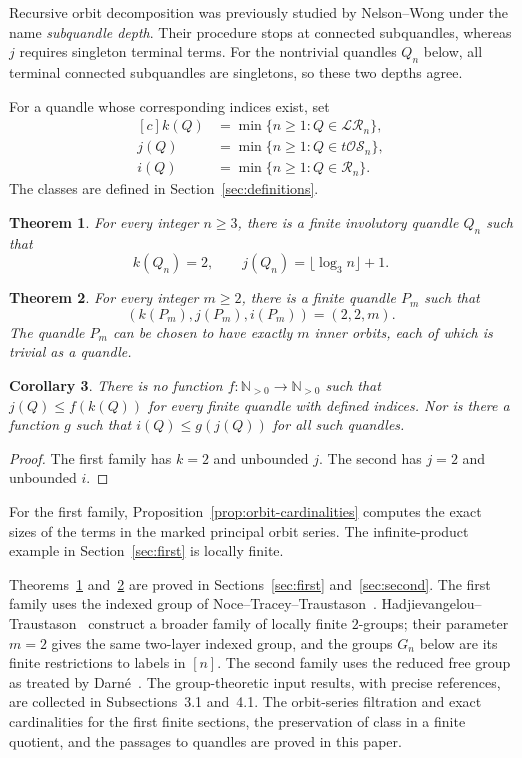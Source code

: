 \documentclass[11pt,a4paper]{article}
\newtheorem{theorem}{Theorem}[section]
\newtheorem{corollary}[theorem]{Corollary}
\theoremstyle{definition}
\theoremstyle{remark}
\newcommand{\R}{\mathcal R}
\newcommand{\LR}{\mathcal{LR}}
\newcommand{\tOS}{t\mathcal{OS}}
\begin{document}
Recursive orbit decomposition was previously studied by Nelson--Wong
\cite[Section~5]{NW} under the name \emph{subquandle depth}.
Their procedure stops at connected subquandles, whereas \(j\) requires
singleton terminal terms. For the nontrivial quandles \(Q_n\) below, all
terminal connected subquandles are singletons, so these two depths agree.

For a quandle whose corresponding indices exist, set
\[
 \begin{aligned}[c]
 k(Q)&=\min\{n\ge1:Q\in\LR_n\},\\
 j(Q)&=\min\{n\ge1:Q\in\tOS_n\},\\
 i(Q)&=\min\{n\ge1:Q\in\R_n\}.
 \end{aligned}
\]
The classes are defined in Section~\ref{sec:definitions}.

\begin{theorem}\label{thm:first}
For every integer \(n\ge3\), there is a finite involutory quandle \(Q_n\)
such that
\[
 k(Q_n)=2,\qquad j(Q_n)=\lfloor\log_3n\rfloor+1.
\]
\end{theorem}

\begin{theorem}\label{thm:second}
For every integer \(m\ge2\), there is a finite quandle \(P_m\)
such that
\[
 (k(P_m),j(P_m),i(P_m))=(2,2,m).
\]
The quandle \(P_m\) can be chosen to have exactly \(m\) inner orbits,
each of which is trivial as a quandle.
\end{theorem}

\begin{corollary}\label{cor:nobounds}
There is no function \(f:\mathbb N_{>0}\to\mathbb N_{>0}\)
such that \(j(Q)\le f(k(Q))\) for every finite quandle
with defined indices. Nor is there a function \(g\)
such that \(i(Q)\le g(j(Q))\) for all such quandles.
\end{corollary}
\begin{proof}
The first family has \(k=2\) and unbounded \(j\).
The second has \(j=2\) and unbounded \(i\).
\end{proof}

For the first family, Proposition~\ref{prop:orbit-cardinalities}
computes the exact sizes of the terms in the marked principal orbit
series. The infinite-product example in
Section~\ref{sec:first} is locally finite.

Theorems~\ref{thm:first} and~\ref{thm:second} are proved in
Sections~\ref{sec:first} and~\ref{sec:second}.
The first family uses the indexed group of Noce--Tracey--Traustason~\cite{NTT}.
Hadjievangelou--Traustason~\cite{HT} construct a broader family of locally
finite \(2\)-groups; their parameter \(m=2\) gives the same two-layer indexed
group, and the groups \(G_n\) below are its finite restrictions to labels in
\([n]\). The second family uses the reduced free group as treated by
Darn\'e~\cite{Darne}. The group-theoretic input results, with precise
references, are collected in Subsections~3.1 and~4.1. The orbit-series
filtration and exact cardinalities for the first finite sections, the
preservation of class in a finite quotient, and the passages to quandles
are proved in this paper.
\end{document}
